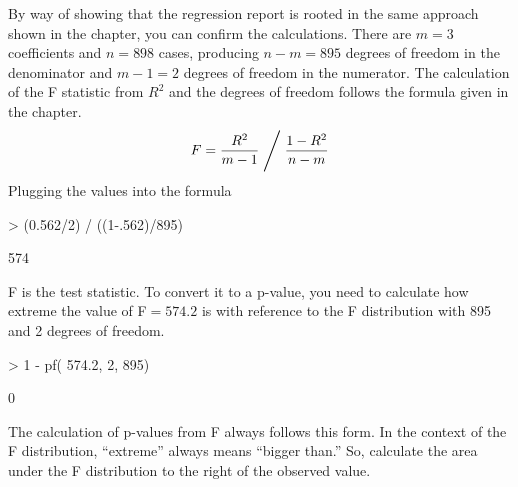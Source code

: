 By way of showing that the regression report is rooted in the same
approach shown in the chapter, you can confirm the calculations.
There are $m=3$ coefficients and $n=898$ cases,
producing $n-m=895$ degrees of freedom in the denominator and $m-1=2$
degrees of freedom in the numerator. The calculation of the F
statistic from $R^2$ and the degrees of freedom follows the formula
given in the chapter.  
$$ F = \frac{R^2}{m-1} \Biggm/ \frac{1-R^2}{n-m} $$
Plugging the values into the formula
\begin{Schunk}
\begin{Sinput}
> (0.562/2) / ((1-.562)/895)
\end{Sinput}
\begin{Soutput}
[1] 574
\end{Soutput}
\end{Schunk}
F is the test statistic.  To convert it to a p-value, you need to
calculate how extreme the value of F$=574.2$ is with reference to the
F distribution with 895 and 2 degrees of freedom.
\begin{Schunk}
\begin{Sinput}
> 1 - pf( 574.2, 2, 895)
\end{Sinput}
\begin{Soutput}
[1] 0
\end{Soutput}
\end{Schunk}
The calculation of p-values from F always follows this form.  In the
context of the F distribution, ``extreme'' always means ``bigger
than.''  So, calculate the area under the F distribution to the right
of the observed value.

